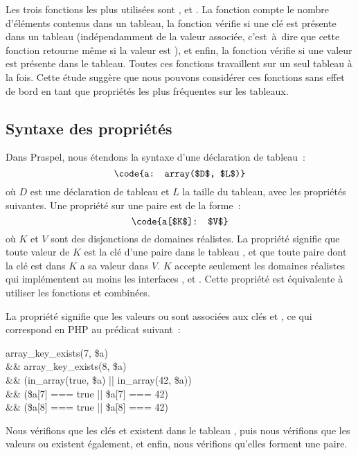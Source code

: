 %
Les trois fonctions les plus utilisées sont ,
 et . La fonction 
compte le nombre d'éléments contenus dans un tableau, la fonction
 vérifie si une clé est présente dans un tableau
(indépendamment de la valeur associée, c'est~à~dire que cette fonction retourne
 même si la valeur est ), et enfin, la fonction
 vérifie si une valeur est présente dans le tableau. Toutes
ces fonctions travaillent sur un seul tableau à la fois. Cette étude suggère que
nous pouvons considérer ces fonctions sans effet de bord en tant que propriétés
les plus fréquentes sur les tableaux.

\subsection{Syntaxe des propriétés}
\label{subsection:data:array_properties}

Dans Praspel, nous étendons la syntaxe d'une déclaration de tableau~:
%
$$\code{a: array($D$, $L$)}$$
%
où $D$ est une déclaration de tableau et $L$ la taille du tableau, avec les
propriétés suivantes. Une propriété sur une paire est de la forme~:
%
$$\code{a[$K$]: $V$}$$
%
où $K$ et $V$ sont des disjonctions de domaines réalistes. La propriété signifie
que toute valeur de $K$ est la clé d'une paire dans le tableau , et que
toute paire dont la clé est dans $K$ a sa valeur dans $V$. $K$ accepte seulement
les domaines réalistes qui implémentent au moins les interfaces ,
 et . Cette propriété est équivalente à utiliser
les fonctions  et  combinées.

\begin{example}

La propriété  signifie que les valeurs  ou
 sont associées aux clés  et , ce qui correspond en PHP
au prédicat suivant~:
%
\begin{pre}
   array\_key\_exists(7, \$a) \\
\&\& array\_key\_exists(8, \$a) \\
\&\& (in\_array(true, \$a) || in\_array(42, \$a)) \\
\&\& (\$a[7] === true     || \$a[7] === 42) \\
\&\& (\$a[8] === true     || \$a[8] === 42)
\end{pre}
%
Nous vérifions que les clés  et  existent dans le tableau
, puis nous vérifions que les valeurs  ou 
existent également, et enfin, nous vérifions qu'elles forment une paire.

\end{example}

